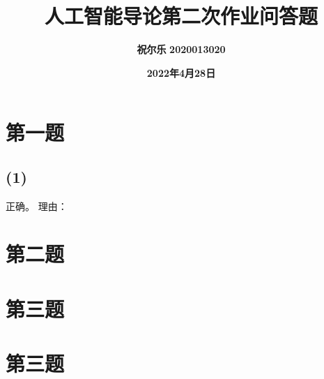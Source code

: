 \documentclass[UTF8]{ctexart}
\title{ \textbf{人工智能导论第二次作业问答题}}
\author{\textbf{祝尔乐}
        \textbf{2020013020}}
\date{\textbf{2022年4月28日}}
\begin{document}
\maketitle

\section{第一题}
\subsection*{(1)}

正确。
理由：


\section{第二题}



\section{第三题}








\section{第三题}
\end{document}
